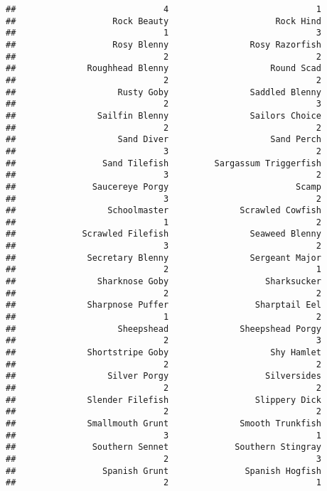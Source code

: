 \documentclass[
]{article}
\begin{document}
\begin{verbatim}
##                             4                             1 
##                   Rock Beauty                     Rock Hind 
##                             1                             3 
##                   Rosy Blenny                Rosy Razorfish 
##                             2                             2 
##              Roughhead Blenny                    Round Scad 
##                             2                             2 
##                    Rusty Goby                Saddled Blenny 
##                             2                             3 
##                Sailfin Blenny                Sailors Choice 
##                             2                             2 
##                    Sand Diver                    Sand Perch 
##                             3                             2 
##                 Sand Tilefish         Sargassum Triggerfish 
##                             3                             2 
##               Saucereye Porgy                         Scamp 
##                             3                             2 
##                  Schoolmaster              Scrawled Cowfish 
##                             1                             2 
##             Scrawled Filefish                Seaweed Blenny 
##                             3                             2 
##              Secretary Blenny                Sergeant Major 
##                             2                             1 
##                Sharknose Goby                   Sharksucker 
##                             2                             2 
##              Sharpnose Puffer                 Sharptail Eel 
##                             1                             2 
##                    Sheepshead              Sheepshead Porgy 
##                             2                             3 
##              Shortstripe Goby                    Shy Hamlet 
##                             2                             2 
##                  Silver Porgy                   Silversides 
##                             2                             2 
##              Slender Filefish                 Slippery Dick 
##                             2                             2 
##              Smallmouth Grunt              Smooth Trunkfish 
##                             3                             1 
##               Southern Sennet             Southern Stingray 
##                             2                             3 
##                 Spanish Grunt               Spanish Hogfish 
##                             2                             1 

\end{verbatim}
\end{document}
